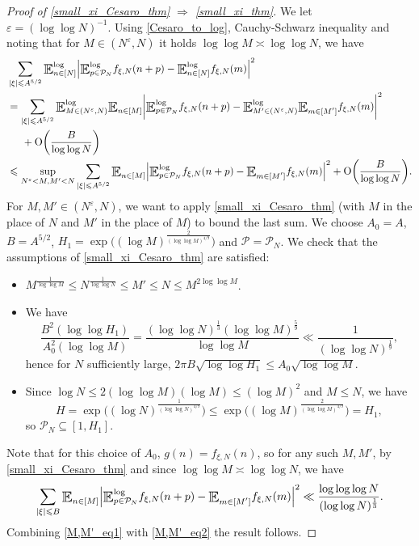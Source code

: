 \documentclass[letter,11pt]{article}
\theoremstyle{plain} %
\theoremstyle{definition} %
\theoremstyle{plain}
\theoremstyle{plain}
\theoremstyle{plain}
\numberwithin{equation}{section}
\newcommand{\Oh}{{\mathrm O}}
\renewcommand{\epsilon}{\varepsilon}
\renewcommand{\leq}{\leqslant}
\renewcommand{\subset}{\subseteq}
\newcommand{\E}{\raisebox{-0.4ex}{\scalebox{1.4}[1.3]{$\mathbb{E}$}}}
\newcommand{\Esub}[1]{\raisebox{-0.4ex}{\scalebox{1.4}[1.3]{$\mathbb{E}$}}\raisebox{-0.35ex}{\ensuremath{_{\scriptstyle #1}}}}
\newcommand{\logE}{{\E}^{\log}}
\newcommand{\1}{\mathbbm{1}}
\newcommand{\f}{f_{\xi,N}}
\newcommand{\Pc}{\mathcal{P}}
\begin{document}
\begin{proof}[Proof of \cref{small_xi_Cesaro_thm} $\Longrightarrow$ \cref{small_xi_thm}]
    We let $\epsilon=(\log\log{N})^{-1}$.
    Using \cref{Cesaro_to_log}, Cauchy-Schwarz inequality and noting that for $M\in(N^\epsilon,N)$ it holds $\log\log{M}\asymp\log\log{N}$, we have 
    \begin{align}\label{M,M'_eq1}
        & \sum_{|\xi|\leq A^{5/2}}\logE_{n\in[N]}\Big|\logE_{p\in\Pc_N} \f(n+p) - \logE_{n\in[N]} \f(m)\Big|^2 \notag \\
        & = \sum_{|\xi|\leq A^{5/2}}\logE_{M\in(N^\epsilon,N)}\Esub{n\in[M]}\bigg|\logE_{p\in\Pc_N} \f(n+p) - \logE_{M'\in(N^\epsilon,N)}\Esub{m\in[M']}\f(m)\bigg|^2 \notag \\
        & \hspace*{.5cm} + \Oh\bigg(\frac{B}{\log\log{N}}\bigg) \notag \\
        & \leq \sup_{N^\epsilon<M,M'<N}\sum_{|\xi|\leq A^{5/2}} \Esub{n\in[M]}\Big|\logE_{p\in\Pc_N} \f(n+p) - \Esub{m\in[M']} \f(m) \Big|^2 + \Oh\bigg(\frac{B}{\log\log{N}}\bigg).
    \end{align}
    For $M,M'\in(N^\epsilon,N)$, we want to apply \cref{small_xi_Cesaro_thm} (with $M$ in the place of $N$ and $M'$ in the place of $M$) to bound the last sum. We choose $A_0 = A$, $B=A^{5/2}$, $H_1 = \exp\big((\log{M})^\frac{2}{(\log\log{M})^{4/9}}\big)$ and $\Pc=\Pc_N$. We check that the assumptions of \cref{small_xi_Cesaro_thm} are satisfied:
    \begin{itemize}
        \item $M^\frac{1}{\log\log{M}}\leq N^\frac{1}{\log\log{N}}\leq M' \leq N\leq M^{2\log\log{M}}$.
        \item We have 
        \begin{equation}\label{assumption_bound}
            \frac{B^2(\log\log{H_1})}{A_0^2(\log\log{M})}
            = \frac{(\log\log{N})^\frac{1}{3}(\log\log{M})^\frac{5}{9}}{\log\log{M}}
            \ll \frac{1}{(\log\log{N})^\frac{1}{9}},
        \end{equation}
        hence for $N$ sufficiently large, $2\pi B\sqrt{\log\log{H_1}}\leq A_0\sqrt{\log\log{M}}$.
        \item Since $\log{N}\leq 2(\log\log{M})(\log{M})\leq (\log{M})^2$ and $M\leq N$, we have 
        $$H = \exp\Big((\log{N})^\frac{1}{(\log\log{N})^{4/9}}\Big)
        \leq \exp\Big((\log{M})^\frac{2}{(\log\log{M})^{4/9}}\Big) = H_1,$$
        so $\Pc_N\subset[1,H_1]$.
    \end{itemize}
    Note that for this choice of $A_0$, $g(n) = \f(n)$, so for any such $M,M'$, by \cref{small_xi_Cesaro_thm} and since $\log\log{M}\asymp\log\log{N}$, we have
    \begin{equation}\label{M,M'_eq2}
        \sum_{|\xi|\leq B} \Esub{n\in[M]}  \Big|\logE_{p\in\Pc_N} \f(n+p) - \Esub{m\in[M']} \f(m) \Big|^2
        \ll \frac{\log\log\log{N}}{(\log\log{N})^\frac{1}{3}}.
    \end{equation}
    Combining \eqref{M,M'_eq1} with \eqref{M,M'_eq2} the result follows.
\end{proof}
\end{document}
